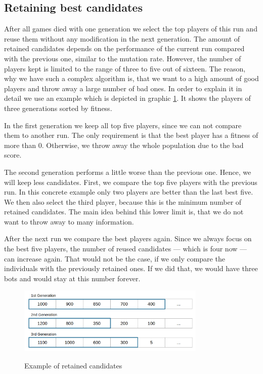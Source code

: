 \documentclass[a4paper,12pt,pagesize,headsepline,bibtotoc,titlepage,abstracton]{scrartcl}
\begin{document}
\subsection{Retaining best candidates}

After all games died with one generation we select the top players of this run and reuse them without any modification in the next generation. The amount of retained candidates depends on the performance of the current run compared with the previous one, similar to the mutation rate. However, the number of players kept is limited to the range of three to five out of sixteen. The reason, why we have such a complex algorithm is, that we want to a high amount of good players and throw away a large number of bad ones. In order to explain it in detail we use an example which is depicted in graphic \ref{abb:retaining}. It shows the players of three generations sorted by fitness.

In the first generation we keep all top five players, since we can not compare them to another run. The only requirement is that the best player has a fitness of more than 0. Otherwise, we throw away the whole population due to the bad score.

The second generation performs a little worse than the previous one. Hence, we will keep less candidates. First, we compare the top five players with the previous run. In this concrete example only two players are better than the last best five. We then also select the third player, because this is the minimum number of retained candidates. The main idea behind this lower limit is, that we do not want to throw away to many information.

After the next run we compare the best players again. Since we always focus on the best five players, the number of reused candidates --- which is four now --- can increase again. That would not be the case, if we only compare the individuals with the previously retained ones. If we did that, we would have three bots and would stay at this number forever.

\begin{figure}[h]
\begin{center}
\includegraphics*[width=0.8\textwidth]{images/retain_candidates}\\
\caption{Example of retained candidates}
\label{abb:retaining}
\end{center}
\end{figure}
\end{document}
